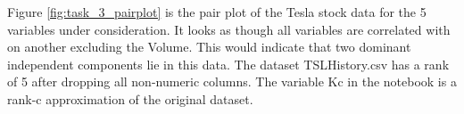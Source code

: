 \documentclass{article}
\begin{document}
	Figure \ref{fig:task_3_pairplot} is the pair plot of the Tesla stock data for the 5 variables under consideration. It looks as though all variables are correlated with on another excluding the Volume. This would indicate that two dominant independent components lie in this data. The dataset TSLHistory.csv has a rank of 5 after dropping all non-numeric columns. The variable Kc in the notebook is a rank-c approximation of the original dataset. 
\end{document}
